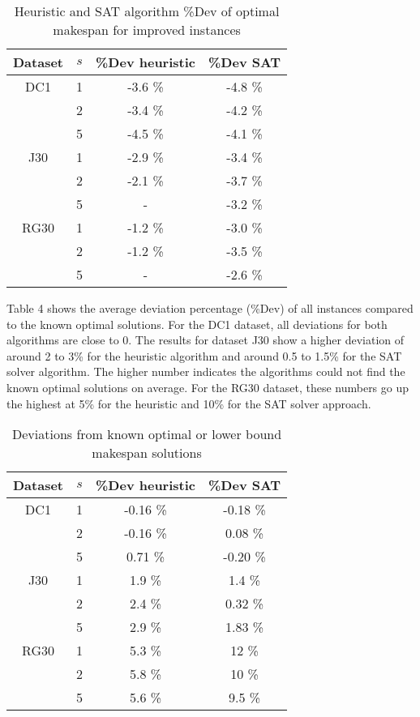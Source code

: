 \begin{table}
	\begin{center}
		\caption{Heuristic and SAT algorithm \%Dev of optimal makespan for improved instances}
		\label{table:table3}
		\begin{tabular}{ c | c c c }
			Dataset & \(s\) & \%Dev heuristic & \%Dev SAT \\
			\hline
			DC1  & 1 & -3.6 \% & -4.8 \% \\ 
			  & 2 & -3.4 \% & -4.2 \% \\  
			  & 5 & -4.5 \% & -4.1 \% \\ 
			J30  & 1 & -2.9 \% & -3.4 \% \\ 
			  & 2 & -2.1 \% & -3.7 \% \\  
			  & 5 & - & -3.2 \% \\ 
			RG30 & 1 & -1.2 \% & -3.0 \% \\ 
			 & 2 & -1.2 \% & -3.5 \% \\  
			 & 5 & - & -2.6 \%
		\end{tabular}
	\end{center}
\end{table}

Table 4 shows the average deviation percentage (\%Dev) of all instances compared to the known optimal solutions. For the DC1 dataset, all deviations for both algorithms are close to 0. The results for dataset J30 show a higher deviation of around 2 to 3\% for the heuristic algorithm and around 0.5 to 1.5\% for the SAT solver algorithm. The higher number indicates the algorithms could not find the known optimal solutions on average. For the RG30 dataset, these numbers go up the highest at 5\% for the heuristic and 10\% for the SAT solver approach.

\begin{table}
	\begin{center}
		\caption{Deviations from known optimal or lower bound makespan solutions}
		\label{table:table4}
		\begin{tabular}{ c | c c c }
			Dataset & \(s\) & \%Dev heuristic & \%Dev SAT \\
			\hline
			DC1  & 1 & -0.16 \% & -0.18 \% \\ 
			  & 2 & -0.16 \% & 0.08 \% \\  
			  & 5 & 0.71 \% & -0.20 \% \\ 
			J30  & 1 & 1.9 \% & 1.4 \% \\ 
			  & 2 & 2.4 \% & 0.32 \% \\  
			  & 5 & 2.9 \% & 1.83 \% \\ 
			RG30 & 1 & 5.3 \% & 12 \% \\ 
			 & 2 & 5.8 \% & 10 \% \\  
			 & 5 & 5.6 \% & 9.5 \%
		\end{tabular}
	\end{center}
\end{table}

